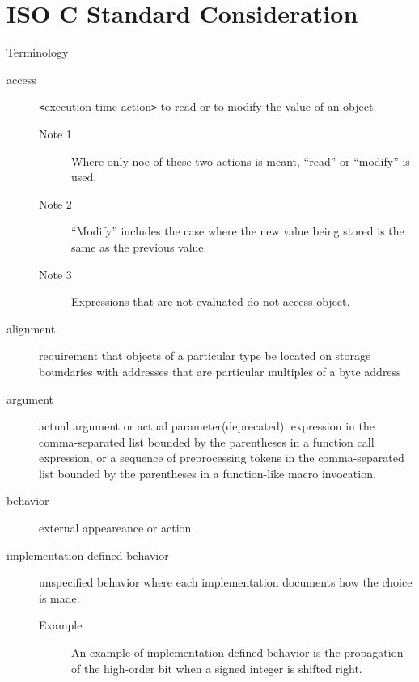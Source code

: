 \chapter{ISO C Standard Consideration}

\begin{faq}
\q Terminology

\A 
\begin{description}
        \item[access] 
        \verb+<+execution-time action\verb+>+
        to read or to modify the
        value of an object.
        \begin{description}
                \item[Note 1] Where only noe of these two actions is
                meant, ``read'' or ``modify'' is used. 
                \item[Note 2] ``Modify'' includes the case where the new value
                being stored is the same as the previous value.
                \item[Note 3] Expressions that are not evaluated do not access 
                object.
        \end{description}

        \item[alignment] requirement that objects of a particular type be
        located on storage boundaries with addresses that are particular
        multiples of a byte address

        \item[argument] actual argument or actual parameter(deprecated).
        expression in the comma-separated list bounded by the parentheses
        in a function call expression, or a sequence of preprocessing tokens in
        the comma-separated list bounded by the parentheses in a function-like
        macro invocation.

        \item[behavior] external appeareance or action

        \item[implementation-defined behavior]
        unspecified behavior where each implementation documents how the
        choice is made.
        \begin{description}
                \item[Example] An example of implementation-defined behavior is
                        the propagation of the high-order bit when a signed 
                        integer is shifted right.
        \end{description}
        

\end{description}
\end{faq}

